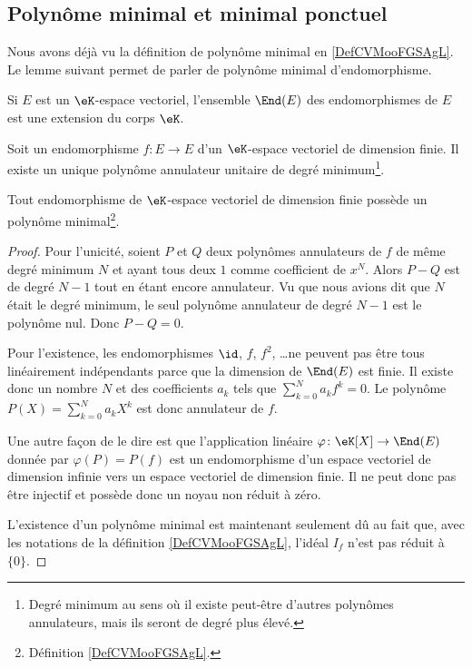 \subsection{Polynôme minimal et minimal ponctuel}

Nous avons déjà vu la définition de polynôme minimal en \ref{DefCVMooFGSAgL}. Le lemme suivant permet de parler de polynôme minimal d'endomorphisme.

\begin{lemma}       \label{LEMooEYPSooLCoPlY}
    Si \( E\) est un \( \eK\)-espace vectoriel, l'ensemble \( \End(E)\) des endomorphismes de \( E\) est une extension du corps \( \eK\).
\end{lemma}

\begin{lemma}        \label{LEMooQJQGooRcAxmJ}
    Soit un endomorphisme \( f\colon E\to E\) d'un \( \eK\)-espace vectoriel de dimension finie. Il existe un unique polynôme annulateur unitaire de degré minimum\footnote{Degré minimum au sens où il existe peut-être d'autres polynômes annulateurs, mais ils seront de degré plus élevé.}.

    Tout endomorphisme de \( \eK\)-espace vectoriel de dimension finie possède un polynôme minimal\footnote{Définition \ref{DefCVMooFGSAgL}.}.
\end{lemma}

\begin{proof}
    Pour l'unicité, soient \( P\) et \( Q\) deux polynômes annulateurs de \( f\) de même degré minimum \( N\) et ayant tous deux \( 1\) comme coefficient de \( x^N\). Alors \( P-Q\) est de degré \( N-1\) tout en étant encore annulateur. Vu que nous avions dit que \( N\) était le degré minimum, le seul polynôme annulateur de degré \( N-1\) est le polynôme nul. Donc \( P-Q=0\).

    Pour l'existence, les endomorphismes \( \id\), \( f\), \( f^2\), \ldots ne peuvent pas être tous linéairement indépendants parce que la dimension de \( \End(E)\) est finie. Il existe donc un nombre \( N\) et des coefficients \( a_k\) tels que \( \sum_{k=0}^Na_kf^k=0\). Le polynôme \( P(X)=\sum_{k=0}^Na_kX^k\) est donc annulateur de \( f\).

    Une autre façon de le dire est que l'application linéaire \( \varphi\colon \eK[X]\to \End(E)\) donnée par \( \varphi(P)=P(f)\) est un endomorphisme d'un espace vectoriel de dimension infinie vers un espace vectoriel de dimension finie. Il ne peut donc pas être injectif et possède donc un noyau non réduit à zéro.

    L'existence d'un polynôme minimal est maintenant seulement dû au fait que, avec les notations de la définition \ref{DefCVMooFGSAgL}, l'idéal \( I_f\) n'est pas réduit à \( \{ 0 \}\).
\end{proof}

